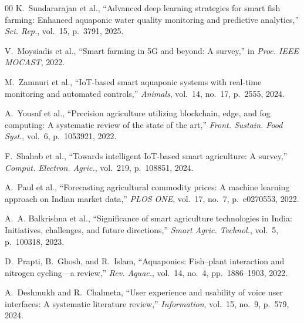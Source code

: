 \documentclass[conference]{IEEEtran}
\begin{document}
\begin{thebibliography}{00}
K.~Sundararajan et al., ``Advanced deep learning strategies for smart fish farming: Enhanced aquaponic water quality monitoring and predictive analytics,'' \textit{Sci. Rep.}, vol.~15, p.~3791, 2025.

V.~Moysiadis et al., ``Smart farming in 5G and beyond: A survey,'' in \textit{Proc. IEEE MOCAST}, 2022.

M.~Zamnuri et al., ``IoT-based smart aquaponic systems with real-time monitoring and automated controls,'' \textit{Animals}, vol.~14, no.~17, p.~2555, 2024.

A.~Yousaf et al., ``Precision agriculture utilizing blockchain, edge, and fog computing: A systematic review of the state of the art,'' \textit{Front. Sustain. Food Syst.}, vol.~6, p.~1053921, 2022.

F.~Shahab et al., ``Towards intelligent IoT-based smart agriculture: A survey,'' \textit{Comput. Electron. Agric.}, vol.~219, p.~108851, 2024.

A.~Paul et al., ``Forecasting agricultural commodity prices: A machine learning approach on Indian market data,'' \textit{PLOS ONE}, vol.~17, no.~7, p.~e0270553, 2022.

A.~A. Balkrishna et al., ``Significance of smart agriculture technologies in India: Initiatives, challenges, and future directions,'' \textit{Smart Agric. Technol.}, vol.~5, p.~100318, 2023.

D.~Prapti, B.~Ghosh, and R.~Islam, ``Aquaponics: Fish--plant interaction and nitrogen cycling---a review,'' \textit{Rev. Aquac.}, vol.~14, no.~4, pp.~1886--1903, 2022.

A.~Deshmukh and R.~Chalmeta, ``User experience and usability of voice user interfaces: A systematic literature review,'' \textit{Information}, vol.~15, no.~9, p.~579, 2024.

\end{thebibliography}
\end{document}
